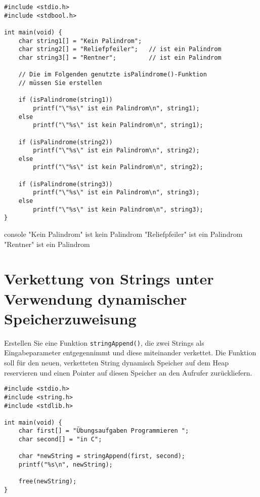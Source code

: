\Vorlage
\begin{verbatim}
#include <stdio.h>
#include <stdbool.h>

int main(void) {
    char string1[] = "Kein Palindrom";
    char string2[] = "Reliefpfeiler";   // ist ein Palindrom
    char string3[] = "Rentner";         // ist ein Palindrom

    // Die im Folgenden genutzte isPalindrome()-Funktion
    // müssen Sie erstellen

    if (isPalindrome(string1))
        printf("\"%s\" ist ein Palindrom\n", string1);
    else
        printf("\"%s\" ist kein Palindrom\n", string1);

    if (isPalindrome(string2))
        printf("\"%s\" ist ein Palindrom\n", string2);
    else
        printf("\"%s\" ist kein Palindrom\n", string2);

    if (isPalindrome(string3))
        printf("\"%s\" ist ein Palindrom\n", string3);
    else
        printf("\"%s\" ist kein Palindrom\n", string3);
}
\end{verbatim}

\begin{mybox}[Bildschirmausgabe]{console}
    "Kein Palindrom" ist kein Palindrom
    "Reliefpfeiler" ist ein Palindrom
    "Rentner" ist ein Palindrom
\end{mybox}




\chapter{Verkettung von Strings unter Verwendung dynamischer Speicherzuweisung}

\vspace{10pt}

Erstellen Sie eine Funktion \texttt{stringAppend()}, die zwei Strings als
Eingabeparameter entgegennimmt und diese miteinander verkettet. Die Funktion
soll für den neuen, verketteten String dynamisch Speicher auf dem Heap
reservieren und einen Pointer auf diesen Speicher an den Aufrufer zurückliefern.

\Vorlage
\begin{verbatim}
#include <stdio.h>
#include <string.h>
#include <stdlib.h>

int main(void) {
    char first[] = "Übungsaufgaben Programmieren ";
    char second[] = "in C";

    char *newString = stringAppend(first, second);
    printf("%s\n", newString);

    free(newString);
}
\end{verbatim}

